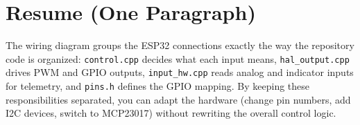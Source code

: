 \section{Resume (One Paragraph)}
\label{sec:wiring-resume}

The wiring diagram groups the ESP32 connections exactly the way the repository code is organized:
\texttt{control.cpp} decides what each input means, \texttt{hal\_output.cpp} drives PWM and GPIO outputs,
\texttt{input\_hw.cpp} reads analog and indicator inputs for telemetry, and \texttt{pins.h} defines the GPIO mapping.
By keeping these responsibilities separated, you can adapt the hardware (change pin numbers, add I2C devices, switch to MCP23017)
without rewriting the overall control logic.

